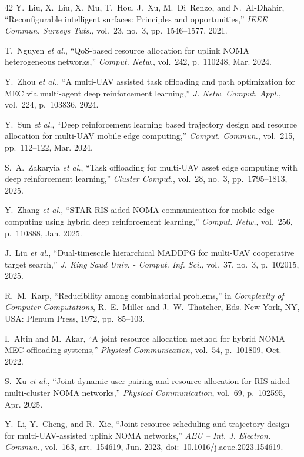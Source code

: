 \documentclass[journal]{IEEEtran}
\begin{document}
\begin{thebibliography}{42}
 Y.~Liu, X.~Liu, X.~Mu, T.~Hou, J.~Xu, M.~Di~Renzo, and N.~Al-Dhahir, ``Reconfigurable intelligent surfaces: Principles and opportunities,'' \emph{IEEE Commun. Surveys Tuts.}, vol.~23, no.~3, pp.~1546--1577, 2021.

 T.~Nguyen \emph{et al.}, ``QoS-based resource allocation for uplink NOMA heterogeneous networks,'' \emph{Comput. Netw.}, vol.~242, p.~110248, Mar. 2024.

 Y.~Zhou \emph{et al.}, ``A multi-UAV assisted task offloading and path optimization for MEC via multi-agent deep reinforcement learning,'' \emph{J. Netw. Comput. Appl.}, vol.~224, p.~103836, 2024.

 Y.~Sun \emph{et al.}, ``Deep reinforcement learning based trajectory design and resource allocation for multi-UAV mobile edge computing,'' \emph{Comput. Commun.}, vol.~215, pp.~112--122, Mar. 2024.

 S.~A.~Zakaryia \emph{et al.}, ``Task offloading for multi-UAV asset edge computing with deep reinforcement learning,'' \emph{Cluster Comput.}, vol.~28, no.~3, pp.~1795--1813, 2025.

 Y.~Zhang \emph{et al.}, ``STAR-RIS-aided NOMA communication for mobile edge computing using hybrid deep reinforcement learning,'' \emph{Comput. Netw.}, vol.~256, p.~110888, Jan. 2025.

 J.~Liu \emph{et al.}, ``Dual-timescale hierarchical MADDPG for multi-UAV cooperative target search,'' \emph{J. King Saud Univ. - Comput. Inf. Sci.}, vol.~37, no.~3, p.~102015, 2025.

 R.~M.~Karp, ``Reducibility among combinatorial problems,'' in \emph{Complexity of Computer Computations}, R.~E.~Miller and J.~W.~Thatcher, Eds. New York, NY, USA: Plenum Press, 1972, pp.~85--103.

 I.~Altin and M.~Akar, ``A joint resource allocation method for hybrid NOMA MEC offloading systems,'' \emph{Physical Communication}, vol.~54, p.~101809, Oct. 2022.

 S.~Xu \emph{et al.}, ``Joint dynamic user pairing and resource allocation for RIS-aided multi-cluster NOMA networks,'' \emph{Physical Communication}, vol.~69, p.~102595, Apr. 2025.

 Y.~Li, Y.~Cheng, and R.~Xie, ``Joint resource scheduling and trajectory design for multi-UAV-assisted uplink NOMA networks,'' \emph{AEU -- Int. J. Electron. Commun.}, vol.~163, art.~154619, Jun. 2023, doi:~10.1016/j.aeue.2023.154619.


\end{thebibliography}
\end{document}
